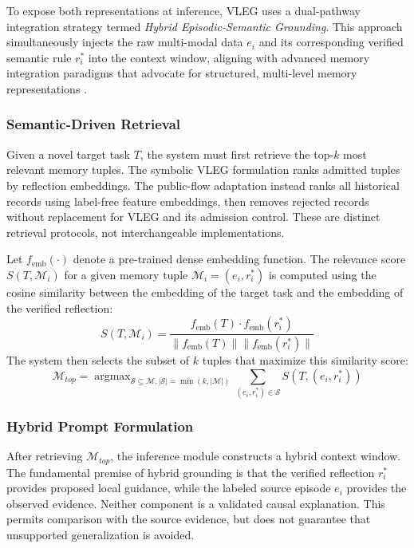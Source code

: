 \documentclass[onecolumn]{IEEEtran}
\numberwithin{equation}{section}
\theoremstyle{definition}
\theoremstyle{remark}
\begin{document}
To expose both representations at inference, VLEG uses a dual-pathway integration strategy termed \textit{Hybrid Episodic-Semantic Grounding}. This approach simultaneously injects the raw multi-modal data $e_i$ and its corresponding verified semantic rule $r_i^*$ into the context window, aligning with advanced memory integration paradigms that advocate for structured, multi-level memory representations \cite{wu2025from, zhang2024survey}.

\subsubsection{Semantic-Driven Retrieval}

Given a novel target task $T$, the system must first retrieve the top-$k$ most relevant memory tuples. The symbolic VLEG formulation ranks admitted tuples by reflection embeddings. The public-flow adaptation instead ranks all historical records using label-free feature embeddings, then removes rejected records without replacement for VLEG and its admission control. These are distinct retrieval protocols, not interchangeable implementations.

Let $f_{\mathrm{emb}}(\cdot)$ denote a pre-trained dense embedding function. The relevance score $S(T, \mathcal{M}_i)$ for a given memory tuple $\mathcal{M}_i = (e_i, r_i^*)$ is computed using the cosine similarity between the embedding of the target task and the embedding of the verified reflection:
\begin{equation}
    S(T, \mathcal{M}_i) = \frac{f_{\mathrm{emb}}(T) \cdot f_{\mathrm{emb}}(r_i^*)}{\|f_{\mathrm{emb}}(T)\| \|f_{\mathrm{emb}}(r_i^*)\|}
\end{equation}
The system then selects the subset of $k$ tuples that maximize this similarity score:
\begin{equation}
    \mathcal{M}_{top} = \mathop{\arg\max}_{\mathcal{S} \subseteq \mathcal{M}, |\mathcal{S}|=\min(k,|\mathcal{M}|)} \sum_{(e_i, r_i^*) \in \mathcal{S}} S(T, (e_i, r_i^*))
\end{equation}

\subsubsection{Hybrid Prompt Formulation}

After retrieving $\mathcal{M}_{top}$, the inference module constructs a hybrid context window. The fundamental premise of hybrid grounding is that the verified reflection $r_i^*$ provides proposed local guidance, while the labeled source episode $e_i$ provides the observed evidence. Neither component is a validated causal explanation. This permits comparison with the source evidence, but does not guarantee that unsupported generalization is avoided.
\end{document}
